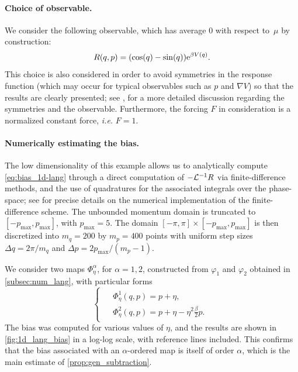 \paragraph{Choice of observable.} We consider the following observable, which has average 0 with respect to~$\mu$ by construction: 
%
\begin{equation}
	R(q,p) = \paren*{\cos(q) - \sin(q)} \e^{\beta V(q)}.
	\label{eq:R_observable}
\end{equation}
%
This choice is also considered in order to avoid symmetries in the response function (which may occur for typical observables such as $p$ and $\nabla V$) so that the results are clearly presented; see \cite[Section~4.2]{synthetic2023}, for a more detailed discussion regarding the symmetries and the observable. Furthermore, the forcing $F$ in consideration is a normalized constant force, \emph{i.e.} $F = 1$.

\paragraph{Numerically estimating the bias.} The low dimensionality of this example allows us to analytically compute \eqref{eq:bias_1d-lang} through a direct computation of $-\mathcal{L}^{-1}R$ via finite-difference methods, and the use of quadratures for the associated integrals over the phase-space; see \cite[Appendix B]{synthetic2023} for precise details on the numerical implementation of the finite-difference scheme. The unbounded momentum domain is truncated to $[-p_\mathrm{max},p_\mathrm{max}]$, with $p_\mathrm{max} = 5$. The domain $[-\pi,\pi] \times [-p_\mathrm{max},p_\mathrm{max}]$ is then discretized into $m_q = 200$ by $m_p = 400$ points with uniform step sizes $\Delta q = 2\pi/m_q$ and $\Delta p = 2p_\mathrm{max}/(m_p-1)$. 

We consider two maps $\Phi_\eta^\alpha$, for $\alpha=1,2$, constructed from $\varphi_1$ and $\varphi_2$ obtained in \cref{subsec:num_lang}, with particular forms
%
\begin{equation}
\begin{cases}
\begin{aligned}
	&\Phi_\eta^1(q,p) = p + \eta, \\
	&\Phi_\eta^2(q,p) = p + \eta - \eta^2\frac{\beta}{2}p.
\end{aligned}
\end{cases}
\end{equation}
%
The bias was computed for various values of $\eta$, and the results are shown in \cref{fig:1d_lang_bias} in a log-log scale, with reference lines included. This confirms that the bias associated with an $\alpha$-ordered map is itself of order $\alpha$, which is the main estimate of \cref{prop:gen_subtraction}.

